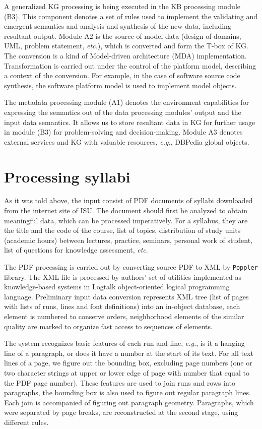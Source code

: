 \documentclass[
]{ceurart}
\begin{document}
A generalized KG processing is being executed in the KB processing module (B3).  This component denotes a set of rules used to implement the validating and emergent semantics and analysis and synthesis of the new data, including resultant output.  Module A2 is the source of model data (design of domains, UML, problem statement, \emph{etc.}), which is converted and form the T-box of KG.  The conversion is a kind of Model-driven architecture (MDA) implementation.  Transformation is carried out under the control of the platform model, describing a context of the conversion.  For example, in the case of software source code synthesis, the software platform model is used to implement model objects.

The metadata processing module (A1) denotes the environment capabilities for expressing the semantics out of the data processing modules' output and the input data semantics.  It allows us to store resultant data in KG for further usage in module (B3) for problem-solving and decision-making.  Module A3 denotes external services and KG with valuable resources, \emph{e.g.}, DBPedia global objects.

\section{Processing syllabi}

As it was told above, the input consist of PDF documents of syllabi downloaded from the internet site of ISU.  The document should first be analyzed to obtain meaningful data, which can be processed imperatively.  For a syllabus, they are the title and the code of the course, list of topics, distribution of study units (academic hours) between lectures, practice, seminars, personal work of student, list of questions for knowledge assessment, \emph{etc}.

The PDF processing is carried out by converting source PDF to XML by \verb|Poppler| library.  The XML file is processed by authors' set of utilities implemented as knowledge-based systems in Logtalk \cite{logtalk} object-oriented logical programming language.  Preliminary input data conversion represents XML tree (list of pages with lists of runs, lines and font definitions) into an in-object database, each element is numbered to conserve orders, neighborhood elements of the similar quality are marked to organize fast access to sequences of elements.

The system recognizes basic features of each run and line, \emph{e.g.}, is it a hanging line of a paragraph, or does it have a number at the start of its text.  For all text lines of a page, we figure out the bounding box, excluding page numbers (one or two character strings at upper or lower edge of page with number that equal to the PDF page number). These features are used to join runs and rows into paragraphs, the bounding box is also used to figure out regular paragraph lines.  Each join is accompanied of figuring out paragraph geometry. Paragraphs, which were separated by page breaks, are reconstructed at the second stage, using different rules.
\end{document}
